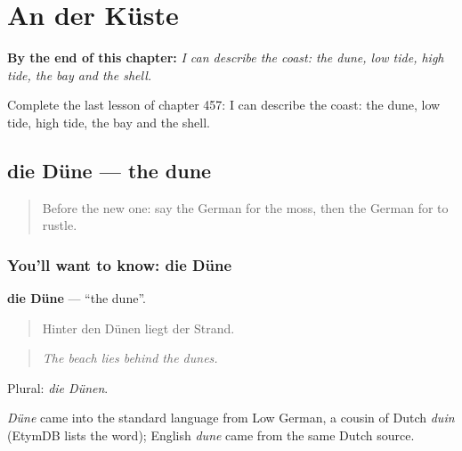 
\chapter{An der Küste}
\label{ch:ge-an-der-kuste}

\begin{chapteropening}
\textbf{By the end of this chapter:} \emph{I can describe the coast: the dune, low tide, high tide, the bay and the shell.}

Complete the last lesson of chapter 457: I can describe the coast: the dune, low tide, high tide, the bay and the shell.
\end{chapteropening}

\section[die Düne]{die Düne — the dune}

\label{lesson:GE-C457-duene}



\begin{quote}
Before the new one: say the German for the moss, then the German for to rustle.
\end{quote}

\subsection*{You'll want to know: die Düne}
\textbf{die Düne} — \textquotedblleft{}the dune\textquotedblright{}.

\begin{quote}
Hinter den Dünen liegt der Strand.
\end{quote}

\begin{quote}
\emph{The beach lies behind the dunes.}
\end{quote}

Plural: \emph{die Dünen}.

\begin{cousinweb}
\emph{Düne} came into the standard language from Low German, a cousin of Dutch \emph{duin} (EtymDB lists the word); English \emph{dune} came from the same Dutch source.
\end{cousinweb}

